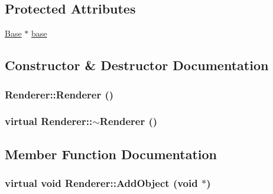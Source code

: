 \subsection*{Protected Attributes}
\begin{CompactItemize}
\item 
\hyperlink{class_base}{Base} $\ast$ \hyperlink{class_renderer_de197ee897106c7e38ef027d0b211f5a}{base}
\end{CompactItemize}


\subsection{Constructor \& Destructor Documentation}
\hypertarget{class_renderer_7ebf46f54dab9905f79b80f7fddb76a6}{
\subsubsection[{Renderer}]{\setlength{\rightskip}{0pt plus 5cm}Renderer::Renderer ()}}
\label{class_renderer_7ebf46f54dab9905f79b80f7fddb76a6}


\hypertarget{class_renderer_ba42b60392775e4a492c4d14d4fff29f}{
\subsubsection[{$\sim$Renderer}]{\setlength{\rightskip}{0pt plus 5cm}virtual Renderer::$\sim$Renderer ()}}
\label{class_renderer_ba42b60392775e4a492c4d14d4fff29f}




\subsection{Member Function Documentation}
\hypertarget{class_renderer_661389d49db8d9508f5a3f9f91d48149}{
\subsubsection[{AddObject}]{\setlength{\rightskip}{0pt plus 5cm}virtual void Renderer::AddObject (void $\ast$)}}
\label{class_renderer_661389d49db8d9508f5a3f9f91d48149}




